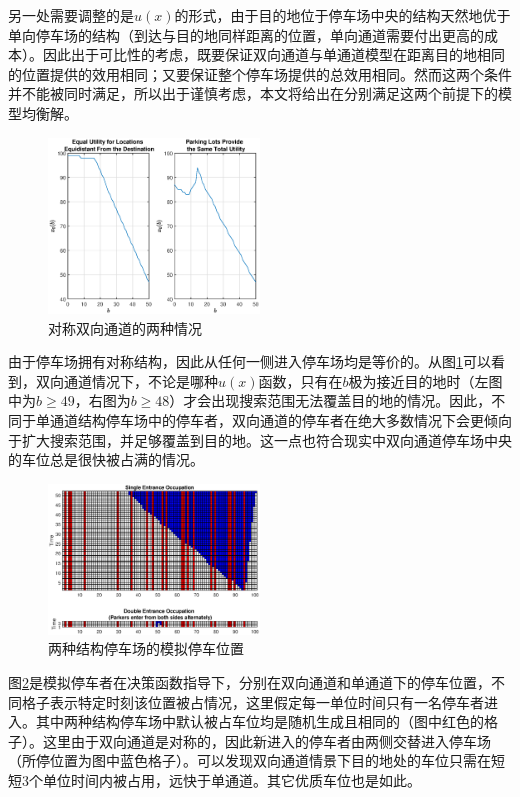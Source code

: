 \documentclass{thuemp}
\begin{document}
\par 另一处需要调整的是$u(x)$的形式，由于目的地位于停车场中央的结构天然地优于单向停车场的结构（到达与目的地同样距离的位置，单向通道需要付出更高的成本）。因此出于可比性的考虑，既要保证双向通道与单通道模型在距离目的地相同的位置提供的效用相同；又要保证整个停车场提供的总效用相同。然而这两个条件并不能被同时满足，所以出于谨慎考虑，本文将给出在分别满足这两个前提下的模型均衡解。

\begin{figure}[H]
    \centering
    \includegraphics[width=0.5\textwidth]{double_entrance.eps}
    \caption{对称双向通道的两种情况}
    \label{fig:6}
\end{figure}

\par 由于停车场拥有对称结构，因此从任何一侧进入停车场均是等价的。从图\ref{fig:6}可以看到，双向通道情况下，不论是哪种$u(x)$函数，只有在$b$极为接近目的地时（左图中为$b\geq 49$，右图为$b\geq 48$）才会出现搜索范围无法覆盖目的地的情况。因此，不同于单通道结构停车场中的停车者，双向通道的停车者在绝大多数情况下会更倾向于扩大搜索范围，并足够覆盖到目的地。这一点也符合现实中双向通道停车场中央的车位总是很快被占满的情况。

\begin{figure}[H]
    \centering
    \includegraphics[width=0.5\textwidth]{occupation.eps}
    \caption{两种结构停车场的模拟停车位置}
    \label{fig:7}
\end{figure}

\par 图\ref{fig:7}是模拟停车者在决策函数指导下，分别在双向通道和单通道下的停车位置，不同格子表示特定时刻该位置被占情况，这里假定每一单位时间只有一名停车者进入。其中两种结构停车场中默认被占车位均是随机生成且相同的（图中红色的格子）。这里由于双向通道是对称的，因此新进入的停车者由两侧交替进入停车场（所停位置为图中蓝色格子）。可以发现双向通道情景下目的地处的车位只需在短短3个单位时间内被占用，远快于单通道。其它优质车位也是如此。
\end{document}
